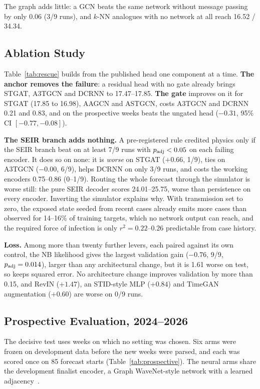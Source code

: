 The graph adds little: a GCN beats the same network without message passing by only
0.06 (3/9 runs), and $k$-NN analogues with no network at all reach 16.52 / 34.34.

\subsection{Ablation Study}
\label{sec:ablation}
Table~\ref{tab:rescue} builds \model{} from the published head one component at a
time. \textbf{The anchor removes the failure}: a residual head with no gate already
brings STGAT, A3TGCN and DCRNN to 17.47--17.85. \textbf{The gate} improves on it for
STGAT (17.85 to 16.98), AAGCN and ASTGCN, costs A3TGCN and DCRNN 0.21 and 0.83, and on
the prospective weeks beats the ungated head ($-0.31$, 95\% CI $[-0.77,-0.08]$).

\textbf{The SEIR branch adds nothing.} A pre-registered rule credited physics only if
the SEIR branch beat \model{} on at least 7/9 runs with $p_{\text{adj}}<0.05$ on each failing
encoder. It does so on none: it is \emph{worse} on STGAT ($+0.66$, 1/9), ties on A3TGCN
($-0.00$, 6/9), helps DCRNN on only 3/9 runs, and costs the working encoders
0.75--0.86 (0--1/9). Routing the whole forecast through the simulator is worse still:
the pure SEIR decoder scores 24.01--25.75, worse than persistence on every encoder.
Inverting the simulator explains why. With transmission set to zero, the exposed state
seeded from recent cases already emits more cases than observed for 14--16\% of
training targets, which no network output can reach, and the required force of
infection is only $r^2=0.22$--$0.26$ predictable from case history.

\textbf{Loss.} Among more than twenty further levers, each paired against its own
control, the NB likelihood gives the largest validation gain ($-0.76$, 9/9,
$p_{\text{adj}}=0.014$), larger than any architectural change, but it is 1.61 worse on test, so
\model{} keeps squared error. No architecture change improves validation by more than
0.15, and RevIN ($+1.47$), an STID-style MLP ($+0.84$) and TimeGAN augmentation
($+0.60$) are worse on 0/9 runs. %

\subsection{Prospective Evaluation, 2024--2026}
\label{sec:prospective}
The decisive test uses weeks on which no setting was chosen. Six arms were frozen on
development data before the new weeks were parsed, and each was scored once on 85
forecast starts (Table~\ref{tab:prospective}). The neural arms share the development
finalist encoder, a Graph WaveNet-style network with a learned
adjacency~\cite{wu2019graphwavenet}.

